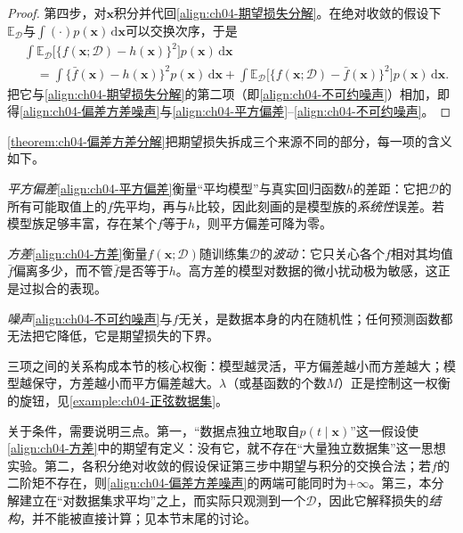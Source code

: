 \documentclass[../../main.tex]{subfiles}
\begin{document}
\begin{proof}
第四步，对$\boldsymbol{x}$积分并代回\eqref{align:ch04-期望损失分解}。在绝对收敛的假设下$\mathbb{E}_{\mathcal{D}}$与$\int(\cdot)p(\boldsymbol{x})\,\mathrm{d}\boldsymbol{x}$可以交换次序，于是
\begin{align*}
  &\int\mathbb{E}_{\mathcal{D}}\bigl[\{f(\boldsymbol{x};\mathcal{D})-h(\boldsymbol{x})\}^2\bigr]p(\boldsymbol{x})\,\mathrm{d}\boldsymbol{x}\\
  &\quad=\int\{\bar{f}(\boldsymbol{x})-h(\boldsymbol{x})\}^2p(\boldsymbol{x})\,\mathrm{d}\boldsymbol{x}
  +\int\mathbb{E}_{\mathcal{D}}\bigl[\{f(\boldsymbol{x};\mathcal{D})-\bar{f}(\boldsymbol{x})\}^2\bigr]p(\boldsymbol{x})\,\mathrm{d}\boldsymbol{x}.
\end{align*}
把它与\eqref{align:ch04-期望损失分解}的第二项（即\eqref{align:ch04-不可约噪声}）相加，即得\eqref{align:ch04-偏差方差噪声}与\eqref{align:ch04-平方偏差}--\eqref{align:ch04-不可约噪声}。
\end{proof}

\begin{remark}
\cref{theorem:ch04-偏差方差分解}把期望损失拆成三个来源不同的部分，每一项的含义如下。

\emph{平方偏差}\eqref{align:ch04-平方偏差}衡量“平均模型”与真实回归函数$h$的差距：它把$\mathcal{D}$的所有可能取值上的$f$先平均，再与$h$比较，因此刻画的是模型族的\emph{系统性}误差。若模型族足够丰富，存在某个$f$等于$h$，则平方偏差可降为零。

\emph{方差}\eqref{align:ch04-方差}衡量$f(\boldsymbol{x};\mathcal{D})$随训练集$\mathcal{D}$的\emph{波动}：它只关心各个$f$相对其均值$\bar{f}$偏离多少，而不管$\bar{f}$是否等于$h$。高方差的模型对数据的微小扰动极为敏感，这正是过拟合的表现。

\emph{噪声}\eqref{align:ch04-不可约噪声}与$f$无关，是数据本身的内在随机性；任何预测函数都无法把它降低，它是期望损失的下界。

三项之间的关系构成本节的核心权衡：模型越灵活，平方偏差越小而方差越大；模型越保守，方差越小而平方偏差越大。$\lambda$（或基函数的个数$M$）正是控制这一权衡的旋钮，见\cref{example:ch04-正弦数据集}。

关于条件，需要说明三点。第一，“数据点独立地取自$p(t\mid\boldsymbol{x})$”这一假设使\eqref{align:ch04-方差}中的期望有定义：没有它，就不存在“大量独立数据集”这一思想实验。第二，各积分绝对收敛的假设保证第三步中期望与积分的交换合法；若$f$的二阶矩不存在，则\eqref{align:ch04-偏差方差噪声}的两端可能同时为$+\infty$。第三，本分解建立在“对数据集求平均”之上，而实际只观测到一个$\mathcal{D}$，因此它解释损失的\emph{结构}，并不能被直接计算；见本节末尾的讨论。
\end{remark}
\end{document}

